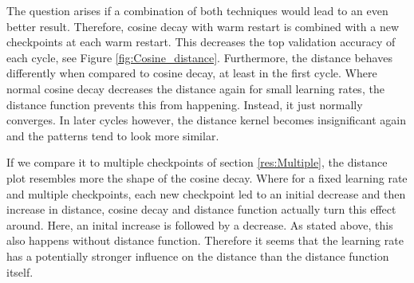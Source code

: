 The question arises if a combination of both techniques would lead to an even
better result. Therefore, cosine decay with warm restart is combined with a new
checkpoints at each warm restart. This decreases the top validation accuracy of
each cycle, see Figure \ref{fig:Cosine_distance}. Furthermore, the distance
behaves differently when compared to cosine decay, at least in the first cycle.
Where normal cosine decay decreases the distance again for small learning rates,
the distance function prevents this from happening. Instead, it just normally
converges. In later cycles however, the distance kernel becomes insignificant
again and the patterns tend to look more similar.

If we compare it to multiple checkpoints of section \ref{res:Multiple}, the
distance plot resembles more the shape of the cosine decay. Where for a fixed
learning rate and multiple checkpoints, each new checkpoint led to an initial
decrease and then increase in distance, cosine decay and distance function
actually turn this effect around. Here, an inital increase is followed by a
decrease. As stated above, this also happens without distance function.
Therefore it seems that the learning rate has a potentially stronger influence
on the distance than the distance function itself.



